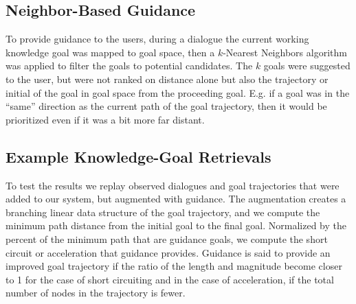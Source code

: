 \subsection{Neighbor-Based Guidance}

To provide guidance to the users, during a dialogue the current working knowledge goal was mapped to goal space, then a $k$-Nearest Neighbors algorithm was applied to filter the goals to potential candidates. The $k$ goals were suggested to the user, but were not ranked on distance alone but also the trajectory or initial of the goal in goal space from the proceeding goal. E.g. if a goal was in the ``same'' direction as the current path of the goal trajectory, then it would be prioritized even if it was a bit more far distant.

\subsection{Example Knowledge-Goal Retrievals}


To test the results we replay observed dialogues and goal trajectories that were added to our system, but augmented with guidance. The augmentation creates a branching linear data structure of the goal trajectory, and we compute the minimum path distance from the initial goal to the final goal. Normalized by the percent of the minimum path that are guidance goals, we compute the short circuit or acceleration that guidance provides. Guidance is said to provide an improved goal trajectory if the ratio of the length and magnitude become closer to 1 for the case of short circuiting and in the case of acceleration, if the total number of nodes in the trajectory is fewer. 
